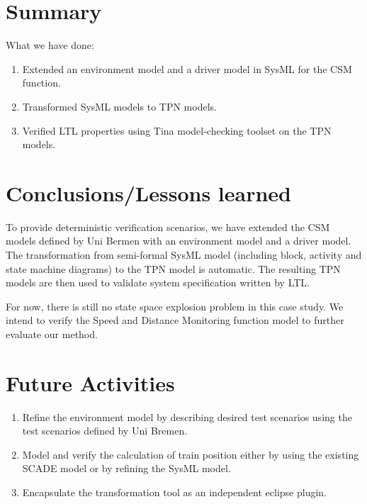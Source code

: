 \section{Summary}

What we have done:
\begin{enumerate}
\item Extended an environment model and a driver model in SysML for the CSM function.
\item Transformed SysML models to TPN models.
\item Verified LTL properties using Tina model-checking toolset on the TPN models.
\end{enumerate}

\section{Conclusions/Lessons learned}

To provide deterministic verification scenarios, we have extended the CSM models defined by Uni Bermen with an environment model and a driver model. 
The transformation from semi-formal SysML model (including block, activity and state machine diagrams) to the TPN model is automatic. The resulting TPN models are then used to validate system specification written by LTL. 

For now, there is still no state space explosion problem in this case study. We intend to verify the Speed and Distance Monitoring function model to further evaluate our method. 

\section{Future Activities}
 \begin{enumerate}
 \item Refine the environment model by describing desired test scenarios using the test scenarios defined by Uni Bremen. 
 \item Model and verify the calculation of train position either by using the existing SCADE model or by refining the SysML model.
 \item Encapsulate the transformation tool as an independent eclipse plugin. 
 \end{enumerate}

%
%

